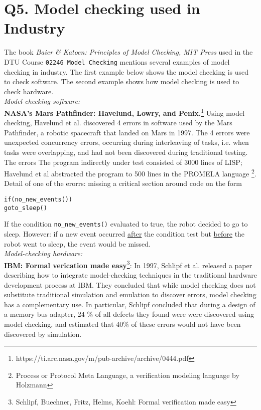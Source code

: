 \section{Q5. Model checking used in Industry}

The book \textit{Baier \& Katoen: Principles of Model Checking, MIT Press} used in the DTU Course \texttt{02246 Model Checking} mentions several examples of model checking in industry. The first example below shows the model checking is used to check software. The second example shows how model checking is used to check hardware. \\

\textit{Model-checking software:}\\
\textbf{NASA's Mars Pathfinder: Havelund, Lowry, and Penix.}\footnote{https://ti.arc.nasa.gov/m/pub-archive/archive/0444.pdf} Using model checking, Havelund et al. discovered 4 errors in software used by the Mars Pathfinder, a robotic spacecraft that landed on Mars in 1997. The 4 errors were unexpected concurrency errors, occurring during interleaving of tasks, i.e. when tasks were overlapping, and had not been discovered during traditional testing. The errors  The program indirectly under test consisted of 3000 lines of LISP; Havelund et al abstracted the program to 500 lines in the PROMELA language \footnote{Process or Protocol Meta Language, a verification modeling language by Holzmann}.\\

Detail of one of the erorrs: missing a critical section around code on the form
\begin{lstlisting}
if(no_new_events())
goto_sleep()
\end{lstlisting}

If the condition \texttt{no\_new\_events()} evaluated to true, the robot decided to go to sleep. However: if a new event occurred \underline{after} the condition test but \underline{before} the robot went to sleep, the event would be missed. \\

\textit{Model-checking hardware:}\\
\textbf{IBM: Formal verication made easy}\footnote{Schlipf, Buechner, Fritz, Helms, Koehl: Formal verification made easy}: In 1997, Schlipf et al. released a paper describing how to integrate 
model-checking techniques in the traditional hardware development process at IBM. They concluded that while model checking does not substitute traditional simulation and emulation to discover errors, model checking has a complementary use. In particular, Schlipf concluded that during a design of a memory bus adapter, 24 \% of all defects they found were were discovered using model checking, and estimated that 40\% of these errors would not have been discovered by simulation. 